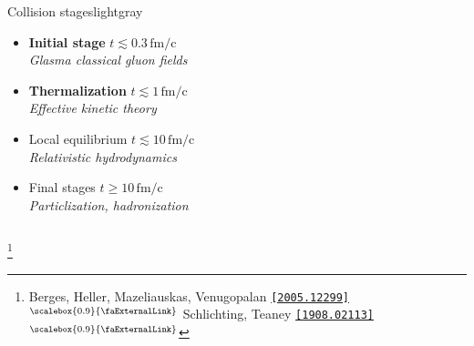\documentclass[aspectratio=169,11pt,usenames,dvipsnames]{beamer}
\renewcommand{\thefootnote}{\color{customblue}\faPaperPlaneO}
\newcommand\blfootnote[1]{%
  \begingroup
  \renewcommand\thefootnote{}\footnote{#1}%
  \addtocounter{footnote}{-1}%
  \endgroup
}
\begin{document}
\begin{frame}
\begin{columns}[onlytextwidth,t]
\begin{center}
\begin{custombox2}{\color{normal}Collision stages}{lightgray}
\begin{varwidth}{0.7\textwidth}
\begin{itemize}
                        {\color{lightgray}\tiny\itshape Color glass condensate}
                    \item {{\bfseries\color{isgold} Initial stage} {\tiny $t\lesssim
                    0.3\,\mathrm{fm/c}$}}\\[1pt]
                        {\color{lightgray}\tiny\itshape Glasma classical gluon fields}
                    \item {\bfseries\color{isgold}Thermalization} {\tiny$t\lesssim
                    1\,\mathrm{fm/c}$}\\[1pt] 
                        {\color{lightgray}\tiny\itshape Effective kinetic theory}
                     \item Local equilibrium {\tiny $t\lesssim 10\,\mathrm{fm/c}$}\\[1pt]
                    {\color{lightgray}\tiny\itshape Relativistic hydrodynamics} 
                    \item Final stages {\tiny $t\geq 10\,\mathrm{fm/c}$}\\[1pt]
                    {\color{lightgray}\tiny\itshape Particlization, hadronization}
                \end{itemize}
                \end{varwidth}
            \end{custombox2}
            \end{center}
    \end{columns}
    \blfootnote{\scriptsize Berges, Heller, Mazeliauskas, Venugopalan \href{https://arxiv.org/abs/2005.12299}{{\color{palgold}\texttt{[2005.12299]$^\text{\scalebox{0.9}{\faExternalLink}}$}}} Schlichting, Teaney \href{https://arxiv.org/abs/1908.02113}{{\color{palgold}\texttt{[1908.02113]$^\text{\scalebox{0.9}{\faExternalLink}}$}}}}
\end{frame}
\end{document}
